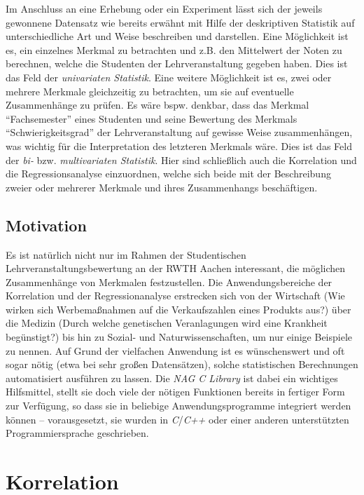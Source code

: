 \documentclass{article}
\begin{document}
Im Anschluss an eine Erhebung oder ein Experiment lässt sich  der jeweils gewonnene Datensatz wie bereits erwähnt mit Hilfe der deskriptiven Statistik auf unterschiedliche Art und Weise beschreiben und darstellen. Eine Möglichkeit ist es, ein einzelnes Merkmal zu betrachten und z.B. den Mittelwert der Noten zu berechnen, welche die Studenten der Lehrveranstaltung gegeben haben. Dies ist das Feld der {\it univariaten Statistik}. Eine weitere Möglichkeit ist es, zwei oder mehrere Merkmale gleichzeitig zu betrachten, um sie auf eventuelle Zusammenhänge zu prüfen. Es wäre bspw. denkbar, dass das Merkmal "`Fachsemester"' eines Studenten und seine Bewertung des Merkmals "`Schwierigkeitsgrad"' der Lehrveranstaltung auf gewisse Weise zusammenhängen, was wichtig für die Interpretation des letzteren Merkmals wäre. Dies ist das Feld der {\it bi-} bzw. {\it multivariaten Statistik}. Hier sind schließlich auch die Korrelation und die Regressionsanalyse einzuordnen, welche sich beide mit der Beschreibung zweier oder mehrerer Merkmale und ihres Zusammenhangs beschäftigen.

\subsection{Motivation}

Es ist natürlich nicht nur im Rahmen der Studentischen Lehrveranstaltungsbewertung an der RWTH Aachen interessant, die möglichen Zusammenhänge von Merkmalen festzustellen. Die Anwendungsbereiche der Korrelation und der Regressionanalyse erstrecken sich von der Wirtschaft (Wie wirken sich Werbemaßnahmen auf die Verkaufszahlen eines Produkts aus?) über die Medizin (Durch welche genetischen Veranlagungen wird eine Krankheit begünstigt?) bis hin zu Sozial- und Naturwissenschaften, um nur einige Beispiele zu nennen. Auf Grund der vielfachen Anwendung ist es wünschenswert und oft sogar nötig (etwa bei sehr großen Datensätzen), solche statistischen Berechnungen automatisiert ausführen zu lassen. Die {\it NAG C Library} ist dabei ein wichtiges Hilfsmittel, stellt sie doch viele der nötigen Funktionen bereits in fertiger Form zur Verfügung, so dass sie in beliebige Anwendungsprogramme integriert werden können -- vorausgesetzt, sie wurden in {\it C}/{\it C++} oder einer anderen unterstützten Programmiersprache geschrieben.

\section{Korrelation}
\end{document}
